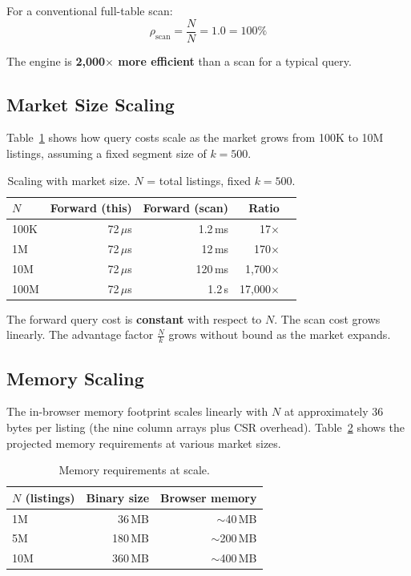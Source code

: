 \documentclass[11pt,a4paper,twoside]{book}
\begin{document}
For a conventional full-table scan:
$$\rho_{\text{scan}} = \frac{N}{N} = 1.0 = 100\%$$

The engine is \textbf{2,000$\times$ more efficient} than a scan for a typical query.

\subsection{Market Size Scaling}

Table~\ref{tab:scale} shows how query costs scale as the market grows from 100K to 10M
listings, assuming a fixed segment size of $k = 500$.

\begin{table}[H]
\centering
\caption{Scaling with market size. $N$ = total listings, fixed $k = 500$.}
\label{tab:scale}
\begin{tabular}{@{}lrrrr@{}}
\toprule
\textbf{$N$} & \textbf{Forward (this)} & \textbf{Forward (scan)} & \textbf{Ratio} \\
\midrule
100K         & 72\,$\mu$s & 1.2\,ms  & 17$\times$ \\
1M           & 72\,$\mu$s & 12\,ms   & 170$\times$ \\
10M          & 72\,$\mu$s & 120\,ms  & 1,700$\times$ \\
100M         & 72\,$\mu$s & 1.2\,s   & 17,000$\times$ \\
\bottomrule
\end{tabular}
\end{table}

The forward query cost is \textbf{constant} with respect to $N$. The scan cost grows linearly.
The advantage factor $\frac{N}{k}$ grows without bound as the market expands.

\subsection{Memory Scaling}

The in-browser memory footprint scales linearly with $N$ at approximately 36 bytes per
listing (the nine column arrays plus CSR overhead). Table~\ref{tab:memory} shows the
projected memory requirements at various market sizes.

\begin{table}[H]
\centering
\caption{Memory requirements at scale.}
\label{tab:memory}
\begin{tabular}{@{}lrr@{}}
\toprule
\textbf{$N$ (listings)} & \textbf{Binary size} & \textbf{Browser memory} \\
\midrule
1M   & 36\,MB  & $\sim$40\,MB  \\
5M   & 180\,MB & $\sim$200\,MB \\
10M  & 360\,MB & $\sim$400\,MB \\
\bottomrule
\end{tabular}
\end{table}
\end{document}
